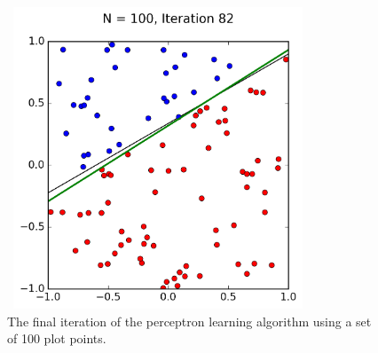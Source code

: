 \documentclass[a4paper]{article}
\begin{document}
\begin{figure}
  \includegraphics[width=9cm,height=9cm]{p_N100_it82.png}
  \caption{The final iteration of the perceptron learning algorithm using a set of 100 plot points.}
  \label{fig:PartD3}
\end{figure}
\end{document}
